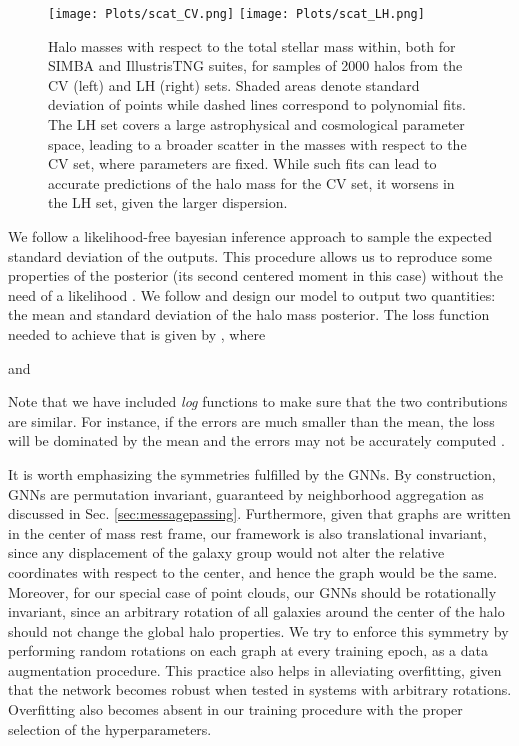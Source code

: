 \documentclass[twocolumn]{aastex631}
\begin{document}
\begin{figure*}[ht!]
\begin{center}
\texttt{[image: Plots/scat\_CV.png]}
\texttt{[image: Plots/scat\_LH.png]}
\caption{Halo masses with respect to the total stellar mass within, both for SIMBA and IllustrisTNG suites, for samples of 2000 halos from the CV (left) and LH (right) sets. Shaded areas denote standard deviation of points while dashed lines correspond to polynomial fits. The LH set covers a large astrophysical and cosmological parameter space, leading to a broader scatter in the masses with respect to the CV set, where parameters are fixed. While such fits can lead to accurate predictions of the halo mass for the CV set, it worsens in the LH set, given the larger dispersion.}
\label{fig:scatplot}
\end{center}
\end{figure*}

We follow a likelihood-free bayesian inference approach to sample the expected standard deviation of the outputs. This procedure allows us to reproduce some properties of the posterior (its second centered moment in this case) without the need of a likelihood \citep{Jeffrey:2020xve}. We follow \citet{moment_networks} and design our model to output two quantities: the mean and standard deviation of the halo mass posterior. The loss function needed to achieve that is given by  , where

and

Note that we have included \textit{log} functions to make sure that the two contributions are similar. For instance, if the errors are much smaller than the mean, the loss will be dominated by the mean and the errors may not be accurately computed \citep[see][for further details]{2021arXiv210910915V}.

It is worth emphasizing the symmetries fulfilled by the GNNs. By construction, GNNs are permutation invariant, guaranteed by neighborhood aggregation as discussed in Sec. \ref{sec:messagepassing}. Furthermore, given that graphs are written in the center of mass rest frame, our framework is also translational invariant, since any displacement of the galaxy group would not alter the relative coordinates with respect to the center, and hence the graph would be the same. Moreover, for our special case of point clouds, our GNNs should be rotationally invariant, since an arbitrary rotation of all galaxies around the center of the halo should not change the global halo properties. We try to enforce this symmetry by performing random rotations on each graph at every training epoch, as a data augmentation procedure. This practice also helps in alleviating overfitting, given that the network becomes robust when tested in systems with arbitrary rotations. Overfitting also becomes absent in our training procedure with the proper selection of the hyperparameters.
\end{document}
